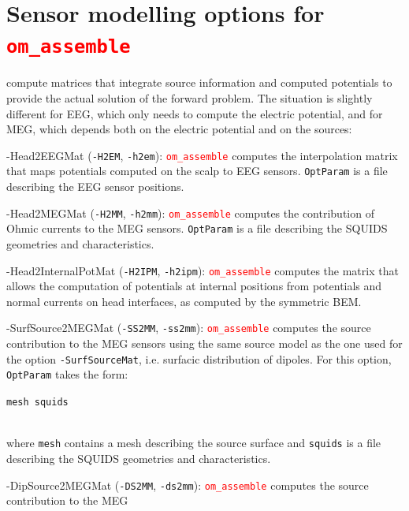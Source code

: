 \documentclass[10pt,journal]{book}
\newcommand{\commandName}[1]{\textcolor{red}{\tt #1}}
\newcommand{\optionName}[1]{\textcolor{OliveGreen}{\tt #1}}
\newcommand{\Param}[1]{{\tt #1}}
\newenvironment{Options}{
    \begin{list}{}{
        \let\makelabel\OptionsLabel\setlength\labelwidth{30pt}%
        \setlength\leftmargin{\labelwidth+\labelsep}}}
    {\end{list}}
\newcommand*\OptionsLabel[1]{\optionName{#1}}
\begin{document}
        \section{Sensor modelling options for \commandName{om\_assemble}} compute matrices that integrate source information and computed potentials to
            provide the actual solution of the forward problem. The situation is slightly different for EEG, which only needs to compute the electric potential,
            and for MEG, which depends both on the electric potential and on the sources:
            \begin{Options}
                \item[-Head2EEGMat] (\optionName{-H2EM}, \optionName{-h2em}): \commandName{om\_assemble} computes the interpolation matrix that maps potentials
                        computed on the scalp to EEG sensors. \optionName{OptParam} is a file describing the EEG sensor positions.
                \item[-Head2MEGMat] (\optionName{-H2MM}, \optionName{-h2mm}): \commandName{om\_assemble} computes the contribution of Ohmic currents to the MEG
                        sensors. \optionName{OptParam} is a file describing the SQUIDS geometries and characteristics.
              \item[-Head2InternalPotMat] (\optionName{-H2IPM}, \optionName{-h2ipm}): \commandName{om\_assemble} computes the matrix that allows
                        the computation of potentials at internal positions from potentials and normal currents on head interfaces, as computed by the symmetric BEM.
                 \item[-SurfSource2MEGMat] (\optionName{-SS2MM}, \optionName{-ss2mm}): \commandName{om\_assemble} computes the source contribution to the MEG
                        sensors using the same source model as the one used for the option \optionName{-SurfSourceMat}, i.e. surfacic distribution of dipoles.
                        For this option, \optionName{OptParam} takes the form:\\
                        \centerline{\Param{mesh squids}}\\
                        where \Param{mesh} contains a mesh describing the source surface and \Param{squids} is a file describing the SQUIDS geometries
                        and characteristics.
                \item[-DipSource2MEGMat] (\optionName{-DS2MM}, \optionName{-ds2mm}): \commandName{om\_assemble} computes the source contribution to the MEG

\end{Options}
\end{document}
